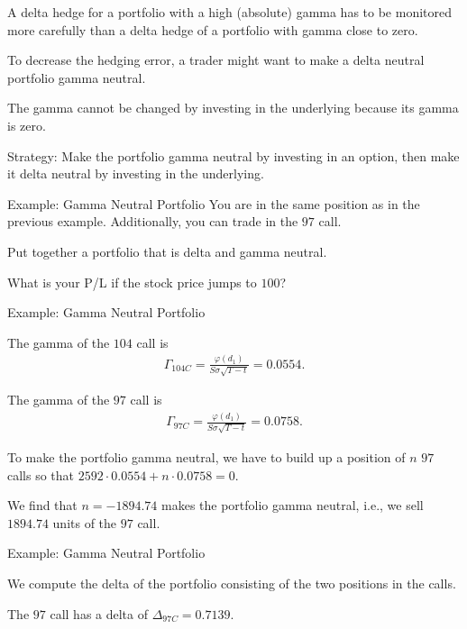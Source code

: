 
	A delta hedge for a portfolio with a high (absolute) gamma has to be
  monitored more carefully than a delta hedge of a portfolio with gamma close to
  zero.

	To decrease the hedging error, a trader might want to make a delta
  neutral portfolio gamma neutral.

	The gamma cannot be changed by investing in the underlying because its
  gamma is zero.

	Strategy: Make the portfolio gamma neutral by investing in an option,
  then make it delta neutral by investing in the underlying.


{Example: Gamma Neutral Portfolio}
You are in the same position as in the previous example. Additionally, you can
trade in the $97$ call.


	Put together a portfolio that is delta and gamma neutral.

	What is your P/L if the stock price jumps to $100$?


{Example: Gamma Neutral Portfolio}


	The gamma of the $104$ call is
  \begin{align*}
  \Gamma_{104C} = \frac{\varphi(d_1)}{S\sigma \sqrt{T-t}} = 0.0554.
  \end{align*}

	The gamma of the $97$ call is
  \begin{align*}
  \Gamma_{97C} = \frac{\varphi(d_1)}{S\sigma \sqrt{T-t}} = 0.0758.
  \end{align*}

	To make the portfolio gamma neutral, we have to build up a position of
  $n$ $97$ calls so that $2592\cdot 0.0554 +n\cdot 0.0758 = 0$.

	We find that $n=-1894.74$ makes the portfolio gamma neutral, i.e., we
  sell $1894.74$ units of the $97$ call.


{Example: Gamma Neutral Portfolio}


	We compute the delta of the portfolio consisting of the two positions in
  the calls.

	The $97$ call has a delta of $\Delta_{97C}=0.7139$.

